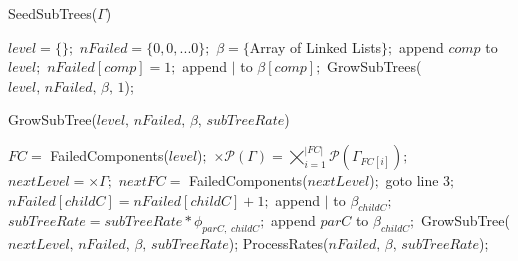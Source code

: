 \documentclass[a4paper,12pt]{article}
\author{Mihir Sanghavi}
\date{November 2012}
\begin{document}
\begin{algorithm}
\caption{SeedSubTrees($\Gamma$)}
\label{alg:seedsubtrees}
\begin{algorithmic}[1]
   \STATE $level = \{\};$ %
   \STATE $nFailed = \{0,0,...0\};$ 
   \STATE $\beta = \{$Array of Linked Lists$\};$ 
   	\STATE append $comp$ to $level;$
    \STATE $nFailed[comp] = 1;$
    \STATE append $|$ to $\beta[comp];$
    \STATE GrowSubTrees($level,\, nFailed,\, \beta,\, 1$);
   \ENDIF
\ENDFOR
\end{algorithmic}
\end{algorithm}

\begin{algorithm}
\caption{GrowSubTree($level,\, nFailed,\, \beta,\, subTreeRate$)}
\label{alg:growsubtree}
\begin{algorithmic}[1]
\STATE $FC =$ FailedComponents($level$)$;$
\STATE $\times\mathcal{P}(\Gamma) = \bigtimes\limits_{i=1}^{|FC|}\mathcal{P}(\Gamma_{FC[i]});$ 
\\ 
    \STATE $nextLevel = \times\Gamma;$ %
    \STATE $nextFC =$ FailedComponents($nextLevel$)$;$
            \STATE goto line 3$;$ 
            \STATE $nFailed[childC] = nFailed[childC] + 1;$
            \STATE append $|$ to $\beta_{childC};$ 
            \STATE $subTreeRate = subTreeRate * \phi_{parC,\; childC};$ 
          \ELSE
           \STATE append $parC$ to $\beta_{childC};$ 
         \ENDIF
       \ENDIF
      \ENDFOR
    \ENDFOR
      \STATE GrowSubTree($nextLevel,\, nFailed,\, \beta,\, subTreeRate$); 
    \ELSE
      \STATE ProcessRates($nFailed,\, \beta,\, subTreeRate$); 
    \ENDIF
\ENDFOR
\end{algorithmic}
\end{algorithm}
\end{document}
